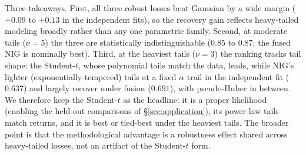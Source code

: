 \documentclass{article}
\begin{document}
Three takeaways. First, all three robust losses beat Gaussian by a wide margin ($+0.09$
to $+0.13$ in the independent fits), so the recovery gain reflects heavy-tailed modeling
broadly rather than any one parametric family. Second, at moderate tails ($\nu{=}5$) the
three are statistically indistinguishable ($0.85$ to $0.87$; the fused NIG is nominally
best). Third, at the heaviest tails ($\nu{=}3$) the ranking tracks tail shape: the
Student-$t$, whose polynomial tails match the data, leads, while NIG's lighter
(exponentially-tempered) tails at a fixed $\alpha$ trail in the independent fit ($0.637$)
and largely recover under fusion ($0.691$), with pseudo-Huber in between. We therefore
keep the Student-$t$ as the headline: it is a proper likelihood (enabling the held-out
comparisons of \S\ref{sec:application}), its power-law tails match returns, and it is
best or tied-best under the heaviest tails. The broader point is that the methodological
advantage is a robustness effect shared across heavy-tailed losses, not an artifact of
the Student-$t$ form.
\end{document}
